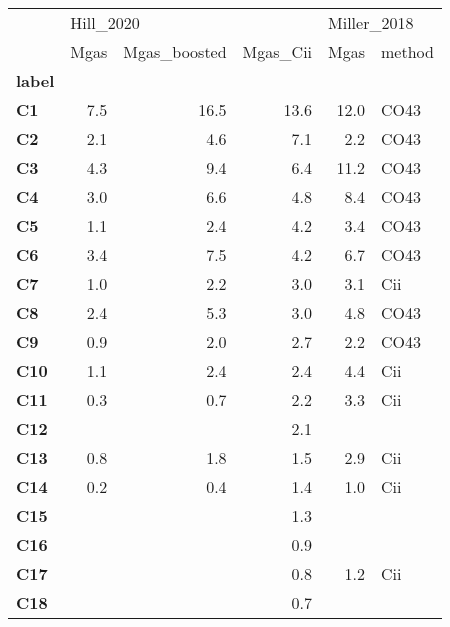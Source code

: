 \begin{tabular}{lrrrrl}
\toprule
{} & \multicolumn{3}{l}{Hill\_2020} & \multicolumn{2}{l}{Miller\_2018} \\
{} &      Mgas & Mgas\_boosted & Mgas\_Cii &        Mgas & method \\
\textbf{label    } &           &              &          &             &        \\
\midrule
\textbf{C1       } &       7.5 &         16.5 &     13.6 &        12.0 &   CO43 \\
\textbf{C2       } &       2.1 &          4.6 &      7.1 &         2.2 &   CO43 \\
\textbf{C3       } &       4.3 &          9.4 &      6.4 &        11.2 &   CO43 \\
\textbf{C4       } &       3.0 &          6.6 &      4.8 &         8.4 &   CO43 \\
\textbf{C5       } &       1.1 &          2.4 &      4.2 &         3.4 &   CO43 \\
\textbf{C6       } &       3.4 &          7.5 &      4.2 &         6.7 &   CO43 \\
\textbf{C7       } &       1.0 &          2.2 &      3.0 &         3.1 &    Cii \\
\textbf{C8       } &       2.4 &          5.3 &      3.0 &         4.8 &   CO43 \\
\textbf{C9       } &       0.9 &          2.0 &      2.7 &         2.2 &   CO43 \\
\textbf{C10      } &       1.1 &          2.4 &      2.4 &         4.4 &    Cii \\
\textbf{C11      } &       0.3 &          0.7 &      2.2 &         3.3 &    Cii \\
\textbf{C12      } &           &              &      2.1 &             &        \\
\textbf{C13      } &       0.8 &          1.8 &      1.5 &         2.9 &    Cii \\
\textbf{C14      } &       0.2 &          0.4 &      1.4 &         1.0 &    Cii \\
\textbf{C15      } &           &              &      1.3 &             &        \\
\textbf{C16      } &           &              &      0.9 &             &        \\
\textbf{C17      } &           &              &      0.8 &         1.2 &    Cii \\
\textbf{C18      } &           &              &      0.7 &             &        \\

\end{tabular}
